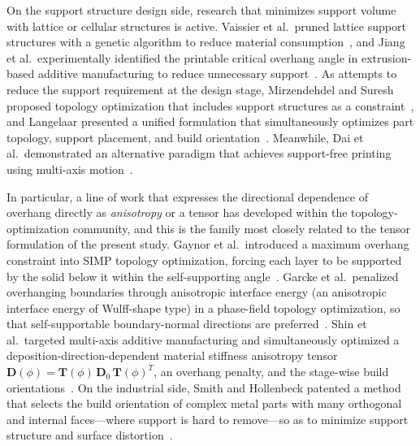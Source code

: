 \documentclass[11pt,a4paper]{article}
\begin{document}
On the support structure design side, research that minimizes support volume with lattice or cellular structures is active.
Vaissier et al.\ pruned lattice support structures with a genetic algorithm to reduce material consumption~\cite{vaissier2019},
and Jiang et al.\ experimentally identified the printable critical overhang angle in extrusion-based additive manufacturing
to reduce unnecessary support~\cite{jiang2018}.
As attempts to reduce the support requirement at the design stage, Mirzendehdel and Suresh proposed topology optimization
that includes support structures as a constraint~\cite{mirzendehdel2016}, and Langelaar presented a unified formulation that simultaneously optimizes
part topology, support placement, and build orientation~\cite{langelaar2018}.
Meanwhile, Dai et al.\ demonstrated an alternative paradigm that achieves support-free printing using multi-axis motion~\cite{dai2018}.

In particular, a line of work that expresses the directional dependence of overhang directly as \emph{anisotropy} or a tensor
has developed within the topology-optimization community, and this is the family most closely related to the tensor formulation of the present study.
Gaynor et al.\ introduced a maximum overhang constraint into SIMP topology optimization, forcing each layer to be supported by the solid below it
within the self-supporting angle~\cite{gaynor2014}.
Garcke et al.\ penalized overhanging boundaries through anisotropic interface energy (an anisotropic interface energy of Wulff-shape type)
in a phase-field topology optimization, so that self-supportable boundary-normal directions are preferred~\cite{garcke2023}.
Shin et al.\ targeted multi-axis additive manufacturing and simultaneously optimized a deposition-direction-dependent material stiffness anisotropy tensor
$\mathbf{D}(\phi)=\mathbf{T}(\phi)\,\mathbf{D}_0\,\mathbf{T}(\phi)^T$, an overhang penalty, and the stage-wise build orientations~\cite{shin2025}.
On the industrial side, Smith and Hollenbeck patented a method that selects the build orientation of complex metal parts
with many orthogonal and internal faces---where support is hard to remove---so as to minimize support structure and surface distortion~\cite{smith2025patent}.
\end{document}
